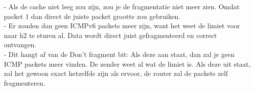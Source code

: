 - Als de cache niet leeg zou zijn, zou je de fragmentatie niet meer zien. Omdat packet 1 dan direct de juiste packet grootte zou gebruiken. \\

- Er zouden dan geen ICMPv6 packets meer zijn, want het weet de limiet voor naar h2 te sturen al. Data wordt direct juist gefragmenteerd en correct ontvangen.\\

- Dit hangt af van de Don't fragment bit: Als deze aan staat, dan zal je geen ICMP packets meer vinden. De zender weet al wat de limiet is. 
Als deze uit staat, zal het gewoon exact hetzelfde zijn als ervoor, de router zal de packets zelf fragmenteren. 